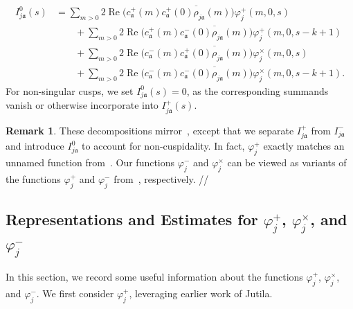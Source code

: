 \documentclass[11pt,reqno]{amsart}
\theoremstyle{plain}
\theoremstyle{definition}
\newtheorem{remark}[theorem]{Remark}
\numberwithin{equation}{section}
\renewcommand{\Re}{\operatorname{Re}}
\begin{document}
\begin{align}
	I_{j\mathfrak{a}}^0(s) \label{eq:I-0-definition}
		&= \sum_{m > 0} 
			2 \Re \big( c_\mathfrak{a}^+(m) \overline{c_\mathfrak{a}^+(0) \rho_{j \mathfrak{a}}(m)} \big)
			\varphi_j^+(m,0,s) \\
		& \qquad +
		\sum_{m > 0} 
			2 \Re \big( c_\mathfrak{a}^+(m) \overline{c_\mathfrak{a}^-(0) \rho_{j \mathfrak{a}}(m)} \big)
			\varphi_j^+(m,0,s-k+1) \\
		& \qquad +
		\sum_{m > 0}
			2 \Re \big(c_\mathfrak{a}^-(m) \overline{c_\mathfrak{a}^+(0) \rho_{j \mathfrak{a}}(m)} \big)
			\varphi_j^\times(m,0,s) \\
		& \qquad +
		\sum_{m > 0}
			2 \Re \big(c_\mathfrak{a}^-(m) \overline{c_\mathfrak{a}^-(0) \rho_{j \mathfrak{a}}(m)} \big)
			\varphi_j^\times(m,0,s-k+1).
\end{align}
For non-singular cusps, we set $I_{j\mathfrak{a}}^0(s) = 0$, as the corresponding summands vanish or otherwise incorporate into $I_{j \mathfrak{a}}^+(s)$.

\begin{remark}
These decompositions mirror~\cite{Jutila96, Jutila97}, except that we separate $I_{j\mathfrak{a}}^+$ from $I_{j \mathfrak{a}}^-$ and introduce $I_{j \mathfrak{a}}^0$ to account for non-cuspidality. In fact, $\varphi_j^+$ exactly matches an unnamed function from~\cite[p.~449]{Jutila96}. Our functions $\varphi_j^-$ and $\varphi_j^\times$ can be viewed as variants of the functions $\varphi_j^+$ and $\varphi_j^-$ from~\cite[(3.4)]{Jutila97}, respectively. \hfill //
\end{remark}

\subsection{Representations and Estimates for \texorpdfstring{$\varphi_j^+$, $\varphi_j^\times$, and $\varphi_j^-$}{phi-plus, phi-cross, and phi-minus}}

In this section, we record some useful information about the functions $\varphi_j^+$, $\varphi_j^\times$, and $\varphi_j^-$. We first consider $\varphi_j^+$, leveraging earlier work of Jutila.
\end{document}
